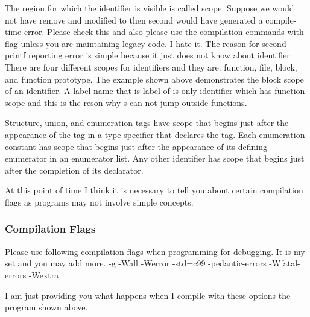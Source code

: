 The region for which the identifier is visible is called
scope. Suppose we would not have remove  and modified
 to  then second  would have
generated a compile-time error. Please check this and also please use
the compilation commands with  flag unless you are
maintaining legacy code. I hate it. The reason for second printf
reporting error is simple because it just does not know about identifier
. There are four different scopes for identifiers and they
are: function, file, block, and function prototype. The example shown
above demonstrates the block scope of an identifier. A label name that
is label of  is only identifier which has function scope
and this is the reson why s can not jump outside functions.

Structure, union, and enumeration tags have scope that begins just
after the appearance of the tag in a type specifier that declares the
tag. Each enumeration constant has scope that begins just after the
appearance of its defining enumerator in an enumerator list. Any other
identifier has scope that begins just after the completion of its
declarator.

At this point of time I think it is necessary to tell you about
certain compilation flags as programs may not involve simple concepts.
\subsubsection{Compilation Flags}
Please use following compilation flags when programming for
debugging. It is my set and you may add more.
\starttyping
-g -Wall -Werror  -std=c99 -pedantic-errors  -Wfatal-errors -Wextra
\stoptyping

I am just providing you what happens when I compile with these options
the program shown above.

